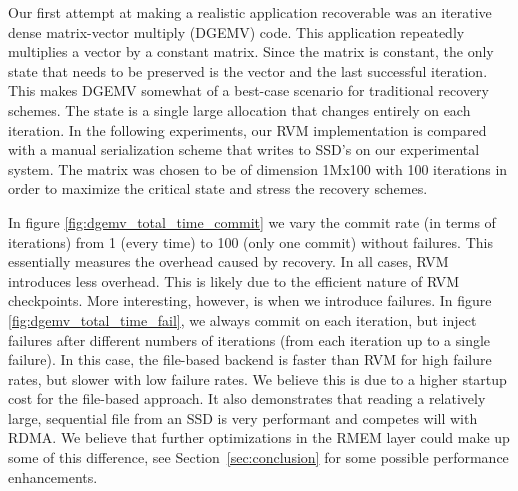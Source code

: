 Our first attempt at making a realistic application recoverable was an iterative
dense matrix-vector multiply (DGEMV) code. This application repeatedly
multiplies a vector by a constant matrix. Since the matrix is constant, the
only state that needs to be preserved is the vector and the last successful
iteration. This makes DGEMV somewhat of a best-case scenario for traditional
recovery schemes. The state is a single large allocation that changes entirely
on each iteration. In the following experiments, our RVM implementation is
compared with a manual serialization scheme that writes to SSD's on our
experimental system. The matrix was chosen to be of dimension 1Mx100 with 100
iterations in order to maximize the critical state and stress the recovery
schemes.


In figure \ref{fig:dgemv_total_time_commit} we vary the commit rate (in terms of
iterations) from 1 (every time) to 100 (only one commit) without failures. This
essentially measures the overhead caused by recovery. In all cases, RVM
introduces less overhead. This is likely due to the efficient nature of RVM
checkpoints. More interesting, however, is when we introduce failures. In figure
\ref{fig:dgemv_total_time_fail}, we always commit on each iteration, but inject
failures after different numbers of iterations (from each iteration up to a
single failure). In this case, the file-based backend is faster than RVM for
high failure rates, but slower with low failure rates. We believe this is due to
a higher startup cost for the file-based approach. It also demonstrates that
reading a relatively large, sequential file from an SSD is very performant and
competes will with RDMA. We believe that further optimizations in the RMEM layer
could make up some of this difference, see Section~\ref{sec:conclusion} for some possible
performance enhancements.

